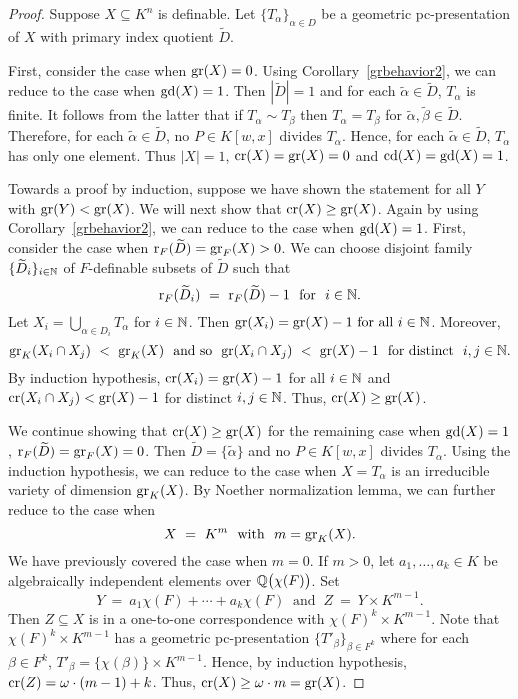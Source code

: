 \begin{proof}
Suppose $X \subseteq K^n$ is definable. Let $\{ T_\alpha \}_{\alpha \in D }$ be a geometric pc-presentation of $X$ with primary index quotient $\widetilde{D}$. 

First, consider the case when $\mathrm{gr}(X)=0$. Using Corollary~\ref{grbehavior2}, we can reduce to the case when $\mathrm{gd}(X)=1$.  
Then  $|\widetilde{D}| = 1$ and for each $\tilde{\alpha} \in \widetilde{D}$, $T_\alpha$ is finite. 
It follows from the latter that  if $T_\alpha \sim T_\beta$ then $T_\alpha =T_\beta$ for $\tilde{\alpha}, \tilde{\beta} \in \widetilde{D}$. 
Therefore, for each $\tilde{\alpha} \in \widetilde{D}$, no $P \in K[w, x]$ divides $T_\alpha$. Hence, for each $\tilde{\alpha} \in \widetilde{D}$, $T_\alpha$ has only one element. Thus $|X| = 1$, $\mathrm{cr}(X)= \mathrm{gr}(X) =0$ and $\mathrm{cd}(X)=\mathrm{gd}(X)=1$.

Towards a proof by induction, suppose we have shown the statement for all $Y$ with $\mathrm{gr}(Y)< \mathrm{gr}(X)$. We will next show that $\mathrm{cr}(X)\geq \mathrm{gr}(X)$.
Again by using Corollary~\ref{grbehavior2}, we can reduce to the case when $\mathrm{gd}(X)=1$.
First, consider the case when $\mathrm{r}_F(\widetilde{D})=\mathrm{gr}_F(X)>0$.
We can choose disjoint family $\{\widetilde{D}_i \}_{i \in \mathbb{N}}$ of $F$-definable subsets of $\widetilde{D}$ such that 
$$\mr_F(\widetilde{D}_i)\ =\ \mr_F(\widetilde{D}) - 1\ \text{ for }\ i\in \nn.$$
Let $X_i = \bigcup_{\alpha \in D_i} T_\alpha$ for $i\in \mathbb{N}$.
Then $\mathrm{gr}(X_i)= \mathrm{gr}(X)-1 \text{ for all } i\in \mathbb{N}$. Moreover, $$\gr_K(X_i \cap X_j)\ <\ \gr_K(X)\ \text{ and so }\ \gr(X_i \cap X_j)\ <\ \gr(X)-1\ \text{ for distinct }\ i,j \in \nn .$$
By induction hypothesis, $\mathrm{cr}(X_i) = \mathrm{gr}(X)-1 $ for all $i \in \mathbb{N}$ and $\mathrm{cr}(X_i \cap X_j)<\mathrm{gr}(X)-1$ for distinct $i, j \in \mathbb{N}$.
Thus, $\mathrm{cr}(X) \geq \mathrm{gr}(X)$.

We continue showing that $\mathrm{cr}(X)\geq \mathrm{gr}(X)$ for the remaining case when $\mathrm{gd}(X)=1$, $\mathrm{r}_F(\widetilde{D})=\mathrm{gr}_F(X)=0$. 
Then $\widetilde{D} = \{ \tilde{\alpha} \}$ and no $P \in K[w, x]$ divides $T_\alpha$. Using the induction hypothesis, we can reduce to the case when $X = T_\alpha$ is an irreducible variety of dimension $\mathrm{gr}_K(X)$.
By Noether normalization lemma, we can further reduce to the case when $$X\ =\ K^m\ \text{ with }\ m=\gr_K(X).$$
We have previously covered the case when $m = 0$. If $m>0$, let $a_1, \ldots, a_k \in K$ be algebraically independent elements over $\mathbb{Q}\big(\chi(F)\big)$. Set $$Y\ =\ a_{1}\chi(F) + \cdots  + a_{k} \chi(F)\ \text{ and }\ Z\ =\ Y \times K^{m-1}.$$
Then $Z\subseteq X$ is in a one-to-one correspondence with $\chi(F)^k \times K^{m-1}$.
Note that $\chi(F)^k \times K^{m-1}$ has a geometric pc-presentation $\{ T'_{\beta} \}_{ \beta \in F^k}$ where for each $\beta \in F^k$, $T'_\beta = \big\{ \chi(\beta) \big\} \times K^{m-1}$. Hence, by induction hypothesis, $\mathrm{cr}(Z)= \omega \cdot (m-1) +k$. Thus, $\mathrm{cr}(X) \geq \omega\cdot m = \mathrm{gr}(X)$.


\end{proof}
